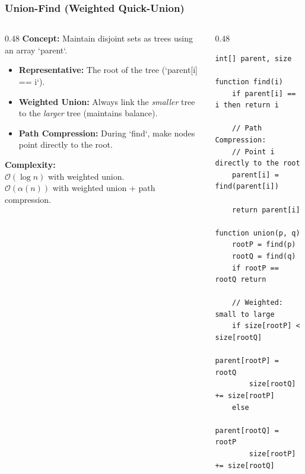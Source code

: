 \documentclass[8pt,aspectratio=169]{beamer}
\begin{document}
\begin{frame}[fragile]
\frametitle{Union-Find (Weighted Quick-Union)}

\begin{columns}[T]
    \begin{column}{0.48\textwidth}
        \textbf{Concept:} Maintain disjoint sets as trees using an array `parent`.
        \begin{itemize}
            \item \textbf{Representative:} The root of the tree (`parent[i] == i`).
            \item \textbf{Weighted Union:} Always link the \textit{smaller} tree to the \textit{larger} tree (maintains balance).
            \item \textbf{Path Compression:} During `find`, make nodes point directly to the root.
        \end{itemize}
        
        \vspace{1em}
        \textbf{Complexity:} \\
        $\mathcal{O}(\log n)$ with weighted union. \\
        $\mathcal{O}(\alpha(n))$ with weighted union + path compression.
    \end{column}

    \begin{column}{0.48\textwidth}
    \begin{lstlisting}[basicstyle=\tiny\ttfamily, frame=single]
int[] parent, size

function find(i)
    if parent[i] == i then return i
    
    // Path Compression:
    // Point i directly to the root
    parent[i] = find(parent[i])
    
    return parent[i]

function union(p, q)
    rootP = find(p)
    rootQ = find(q)
    if rootP == rootQ return

    // Weighted: small to large
    if size[rootP] < size[rootQ]
        parent[rootP] = rootQ
        size[rootQ] += size[rootP]
    else
        parent[rootQ] = rootP
        size[rootP] += size[rootQ]
    \end{lstlisting}
    \end{column}
\end{columns}

\end{frame}
\end{document}
